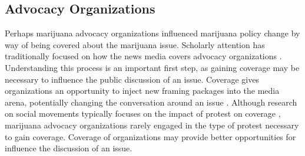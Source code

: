 




\subsection{Advocacy Organizations}

Perhaps marijuana advocacy organizations influenced marijuana policy change by way of being covered about the marijuana issue. Scholarly attention has traditionally focused on how the news media covers advocacy organizations \citep{amenta_et_al_2009,andrews_and_caren_2010}. Understanding this process is an important first step, as gaining coverage may be necessary to influence the public discussion of an issue. Coverage gives organizations an opportunity to inject new framing packages into the media arena, potentially changing the conversation around an issue \citep{gamson_and_modigliani_1989}. Although research on social movements typically focuses on the impact of protest on coverage \citep{earl_et_al_2004,oliver_and_myers_1999}, marijuana advocacy organizations rarely engaged in the type of protest necessary to gain coverage. Coverage of organizations may provide better opportunities for influence the discussion of an issue. 


